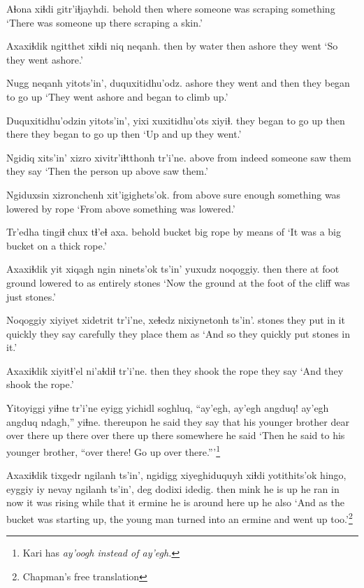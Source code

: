 \documentclass[12pt]{article}
\begin{document}
\gll Aɬona  xiɬdi gitr'iɬjayhdi.
behold  then {where someone was scraping something}  
\glt `There was someone up there scraping a skin.'
\glend

\gll Axaxiɬdik ngitthet xiɬdi niq  neqanh.
then  {by water} then ashore  {they went}
\glt `So they went ashore.'
\glend

\gll Nugg neqanh yitots'in', duquxitidhu'odz.
ashore {they went} {and then} {they began to go up}
\glt `They went ashore and began to climb up.'
\glend

\gll Duquxitidhu'odzin yitots'in', yixi xuxitidhu'ots xiyiɬ.
{they began to go up} then there {they began to go up} then
\glt `Up and up they went.'
\glend

\gll Ngidiq xits'in' xizro  xivitr'iɬtthonh tr'i'ne.
above  from  indeed {someone saw them} {they say}
\glt `Then the person up above saw them.'
\glend

\gll Ngiduxsin xizronchenh xit'igighets'ok.
{from above} {sure enough} {something was lowered by rope}
\glt `From above something was lowered.'
\glend

\gll Tr'edha tingiɬ chux tɬ'eɬ axa.
behold  bucket big rope {by means of}
\glt `It was a big bucket on a thick rope.'
\glend

\gll Axaxiɬdik yit xiqagh ngin  ninets'ok ts'in' yuxudz noqoggiy.
then  there {at foot} ground {lowered to} as entirely stones
\glt `Now the ground at the foot of the cliff was just stones.'
\glend

\gll Noqoggiy {xiyiyet xidetrit} tr'i'ne, xeɬedz nixiynetonh ts'in'.
stones  {they put in it quickly} {they say} carefully {they place them} as
\glt `And so they quickly put stones in it.'
\glend

\gll Axaxiɬdik {xiyitɬ'el ni'aɬdiɬ} tr'i'ne.
then  {they shook the rope} {they say}
\glt `And they shook the rope.'
\glend

\gll Yitoyiggi yiɬne tr'i'ne eyigg  yichidl   soghluq, ``ay'egh, ay'egh angduq! ay'egh angduq ndagh,'' yiɬne.
thereupon {he said} {they say} that {his younger brother} dear  {over there} {} {up there} {over there} {up there} somewhere {he said}
\glt `Then he said to his younger brother, ``over there! Go up over there.'''\footnote{Kari has \em ay'oogh \em instead of \em ay'egh.}
\glend

\gll Axaxiɬdik tixgedr ngilanh ts'in', ngidigg xiyeghiduquyh xiɬdi yotithits'ok hingo, eyggiy iy nevay  ngilanh ts'in', deg dodixi idedig.
then  mink  {he is} {}  up  {he ran in} now {it was rising} while that  it ermine {he is} {}  {around here} up {he also}
\glt `And as the bucket was starting up, the young man turned into an ermine and went up too.'\footnote{Chapman's free translation}
\glend
\end{document}
